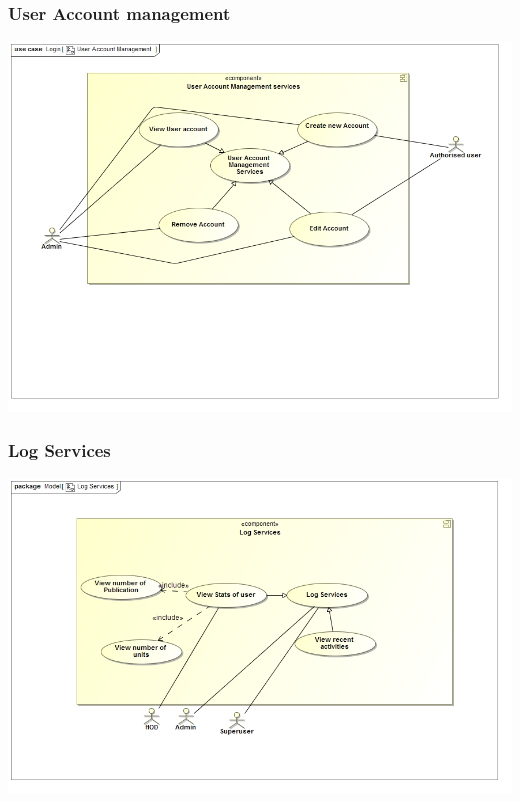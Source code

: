 \documentclass[11pt]{article}
\begin{document}
\begin{center}
\subsubsection{User Account management}
\begin{center} 
	\includegraphics[width=\textwidth]{../Images/UserAccountManagementUC.jpg}\\[0.5cm]
\end{center}
\subsubsection{Log Services}
\begin{center} 
	\includegraphics[width=\textwidth]{../Images/LogServicesUC.jpg}\\[0.5cm]
\end{center}

\end{center}
\end{document}
